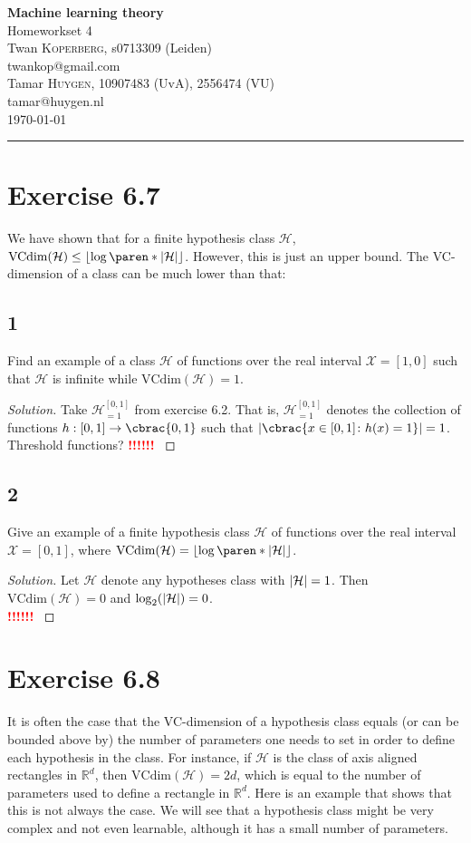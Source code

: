 \documentclass[10pt, a4paper, twoside]{amsart}
\makeatletter
\theoremstyle{plain}
\newcommand{\R}{\ensuremath{\mathbb{R}}}
\DeclarePairedDelimiter\abs{\lvert}{\rvert}
\DeclarePairedDelimiter\cbrac\{\}
\DeclarePairedDelimiter\paren()
\renewcommand{\c}{\ensuremath{\colon}}
\newcommand{\cH}{\ensuremath{\mathcal{H}}}
\newcommand{\cX}{\ensuremath{\mathcal{X}}}
\newenvironment{solution}
               {\let\oldqedsymbol=\qedsymbol
                \renewcommand{\qedsymbol}{$\blacktriangleleft$}
                \begin{proof}[Solution]}
               {\end{proof}
                \renewcommand{\qedsymbol}{\oldqedsymbol}}
\newcommand{\TODO}{\textcolor{red}{\textbf{!!!!!! }}}
\newcommand{\firstName}  {Twan}
\newcommand{\lastName}   {Koperberg}
\newcommand{\studId}     {0713309 (Leiden)}
\renewcommand{\email}    {twankop@gmail.com}
\newcommand{\firstNameII}  {Tamar}
\newcommand{\lastNameII}   {Huygen}
\newcommand{\studIdII}     {10907483 (UvA)}
\newcommand{\studIdIII}    {2556474 (VU)}
\newcommand{\emailII}     {tamar@huygen.nl}
\makeatother
\begin{document}
\begin{center}

  {\huge\bf Machine learning theory}\\
  {\large\sc Homeworkset 4 }\\ \vspace{1em}
  \firstName \textsc{ \lastName}, {\sc s}\studId \\
  \email\text{}\\ \smallskip
  \firstNameII \textsc{ \lastNameII}, \studIdII, \studIdIII\\
  \emailII \\ \bigskip
  \today \\\bigskip
  \hrule
  \bigskip
 \end{center}

 \section*{Exercise 6.7}
 We have shown that for a finite hypothesis class $\cH$, $\text{VCdim}(\cH) \leq \left\lfloor \log \paren*{\abs{\cH}} \right\rfloor$. However, this is just an upper bound. The VC-dimension of a class can be much lower than that:
 \subsection*{1}
 Find an example of a class $\cH$ of functions over the real interval $\cX = [1,0]$ such that $\cH$ is infinite while $\text{VCdim}(\cH) = 1$.
\begin{solution}
 Take $\cH_{=1}^{[0,1]}$ from exercise 6.2. That is, $\cH_{=1}^{[0,1]}$ denotes the collection of functions 
 $h:[0,1]\to \cbrac{0,1}$ such that $\abs{\cbrac{x \in [0,1] \c h(x)=1}}=1$.\\
   Threshold functions?
 \TODO
\end{solution}
\subsection*{2}
Give an example of a finite hypothesis class $\cH$ of functions over the real interval $\cX = [0,1]$, where $\text{VCdim}(\cH) = \left\lfloor \log \paren*{\abs{\cH}} \right\rfloor$.
 \begin{solution}
   Let $\cH$ denote any hypotheses class with $\abs{\cH}=1$. Then $\mathrm{VCdim}(\cH)=0$ and $\log_2(\abs{\cH})=0$.\\
   \TODO
 \end{solution}
 
\section*{Exercise 6.8}
It is often the case that the VC-dimension of a hypothesis class equals (or can be bounded above by) the number of parameters one needs to set in order to define each hypothesis in the class. For instance, if $\cH$ is the class of axis aligned rectangles in $\R^d$, then $\text{VCdim}(\cH) = 2d$, which is equal to the number of parameters used to define a rectangle in $\R^d$. Here is an example that shows that this is not always the case. We will see that a hypothesis class might be very complex and not even learnable, although it has a small number of parameters.
\end{document}
